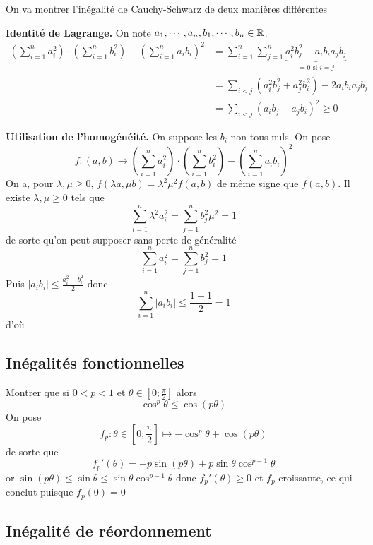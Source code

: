 
On va montrer l'inégalité de Cauchy-Schwarz de deux manières différentes


\textbf{Identité de Lagrange.} On note $a_1, \cdots, a_n, b_1, \cdots, b_n\in\mathbb R$. \begin{align*}
        \left( \sum_{i=1}^na_i^2 \right) \cdot \left( \sum_{i=1}^n b_i^2 \right)- \left( \sum_{i=1}^na_ib_i \right)^2 &= \sum_{i=1}^n\sum_{j=1}^n \underbrace{a_i^2b_j^2-a_ib_ia_jb_j}_{=0\text{ si }i=j} \\
                                                                                                                      &= \sum_{i<j}(a_i^2b_j^2+a_j^2b_i^2)-2a_ib_ia_jb_j \\ 
                                                                                                                      &= \sum_{i<j}(a_ib_j-a_jb_i)^2\geq 0
    \end{align*}

\textbf{Utilisation de l'homogénéité.} On suppose les $b_i$ non tous nuls. On pose \[
    f:(a, b)\longrightarrow \left( \sum_{i=1}^na_i^2 \right) \cdot \left( \sum_{i=1}^n b_i^2 \right)- \left( \sum_{i=1}^na_ib_i \right)^2
\]
On a, pour $\lambda, \mu\geq 0$, $f(\lambda a, \mu b)=\lambda^2\mu^2f(a, b)$ de même signe que $f(a, b)$. Il existe $\lambda, \mu\geq 0$ tels que \[
    \sum_{i=1}^n \lambda^2a_i^2=\sum_{j=1}^nb_j^2\mu^2=1
\]
de sorte qu'on peut supposer sans perte de généralité \[
    \sum_{i=1}^na_i^2=\sum_{j=1}^n b_j^2=1
\]
Puis $|a_ib_i|\leq \frac{a_i^2+b_i^2}2$ donc \[
    \sum_{i=1}^n|a_ib_i|\leq \frac{1+1}2=1
\]
d'où \conc

\subsection{Inégalités fonctionnelles}

Montrer que si $0<p<1$ et $\theta\in \left[ 0; \frac\pi2 \right]$ alors \[
    \cos^p\theta\leq \cos(p\theta)
\]
On pose \[
    f_p:\theta\in \left[ 0;\frac\pi2 \right]\longmapsto -\cos^p\theta+\cos(p\theta)
\]
de sorte que \[
    f_p'(\theta)=-p\sin(p\theta)+p\sin\theta\cos^{p-1}\theta
\]
or $\sin(p\theta)\leq \sin\theta\leq \sin\theta\cos^{p-1}\theta$ donc $f_p'(\theta)\geq 0$ et $f_p$ croissante, ce qui conclut puisque $f_p(0)=0$

\subsection{Inégalité de réordonnement}

